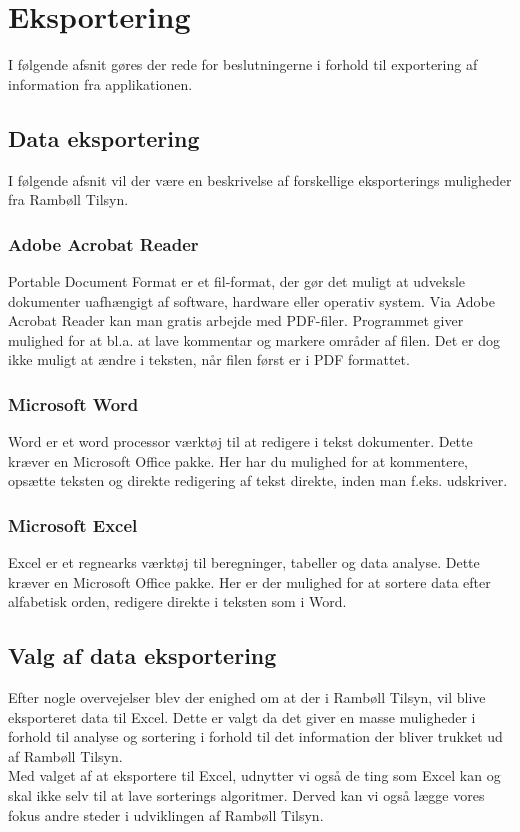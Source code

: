 \section{Eksportering}                                   
I følgende afsnit gøres der rede for beslutningerne i forhold til exportering af information fra applikationen.

\subsection{Data eksportering}
I følgende afsnit vil der være en beskrivelse af forskellige eksporterings muligheder fra Rambøll Tilsyn.

\subsubsection{Adobe Acrobat Reader}
Portable Document Format\cite{PDF} er et fil-format, der gør det muligt at udveksle dokumenter uafhængigt af software, hardware eller operativ system.
Via Adobe Acrobat Reader\cite{AdobeReader} kan man gratis arbejde med PDF-filer. Programmet giver mulighed for at bl.a. at lave kommentar og markere områder af filen. Det er dog ikke muligt at ændre i teksten, når filen først er i PDF formattet.

\subsubsection{Microsoft Word}
Word\cite{Office} er et word processor\cite{WordProcessor} værktøj til at redigere i tekst dokumenter.
Dette kræver en Microsoft Office pakke. Her har du mulighed for at kommentere, opsætte teksten og direkte redigering af tekst direkte, inden man f.eks. udskriver.

\subsubsection{Microsoft Excel}
Excel\cite{Office} er et regnearks værktøj til beregninger, tabeller og data analyse. 
Dette kræver en Microsoft Office pakke. Her er der mulighed for at sortere data efter alfabetisk orden, redigere direkte i teksten som i Word.

\subsection{Valg af data eksportering}
Efter nogle overvejelser blev der enighed om at der i Rambøll Tilsyn, vil blive eksporteret data til Excel. Dette er valgt da det giver en masse muligheder i forhold til analyse og sortering i forhold til det information der bliver trukket ud af Rambøll Tilsyn. \\
Med valget af at eksportere til Excel, udnytter vi også de ting som Excel kan og skal ikke selv til at lave sorterings algoritmer. Derved kan vi også lægge vores fokus andre steder i udviklingen af Rambøll Tilsyn.